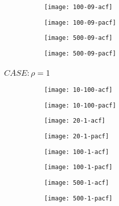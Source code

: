 \begin{figure}[htp]
	\centering
	\begin{subfigure}{0.23\textwidth}
		\centering
		\texttt{[image: 100-09-acf]}
	\end{subfigure}
	\begin{subfigure}{0.23\textwidth}
		\centering
		\texttt{[image: 100-09-pacf]}
	\end{subfigure}
	\begin{subfigure}{0.23\textwidth}
		\centering
		\texttt{[image: 500-09-acf]}
	\end{subfigure}
	\begin{subfigure}{0.23\textwidth}
		\centering
		\texttt{[image: 500-09-pacf]}
	\end{subfigure}
\end{figure}

\pagebreak

\subsubsection{$CASE: \rho = 1$}

\begin{figure}[htp]
	\centering
	\begin{subfigure}{0.23\textwidth}
		\centering
		\texttt{[image: 10-100-acf]}
	\end{subfigure}
	\begin{subfigure}{0.23\textwidth}
		\centering
		\texttt{[image: 10-100-pacf]}
	\end{subfigure}
	\begin{subfigure}{0.23\textwidth}
		\centering
		\texttt{[image: 20-1-acf]}
	\end{subfigure}
	\begin{subfigure}{0.23\textwidth}
		\centering
		\texttt{[image: 20-1-pacf]}
	\end{subfigure}
\end{figure}

\begin{figure}[htp]
	\centering
	\begin{subfigure}{0.23\textwidth}
		\centering
		\texttt{[image: 100-1-acf]}
	\end{subfigure}
	\begin{subfigure}{0.23\textwidth}
		\centering
		\texttt{[image: 100-1-pacf]}
	\end{subfigure}
	\begin{subfigure}{0.23\textwidth}
		\centering
		\texttt{[image: 500-1-acf]}
	\end{subfigure}
	\begin{subfigure}{0.23\textwidth}
		\centering
		\texttt{[image: 500-1-pacf]}
	\end{subfigure}
\end{figure}



